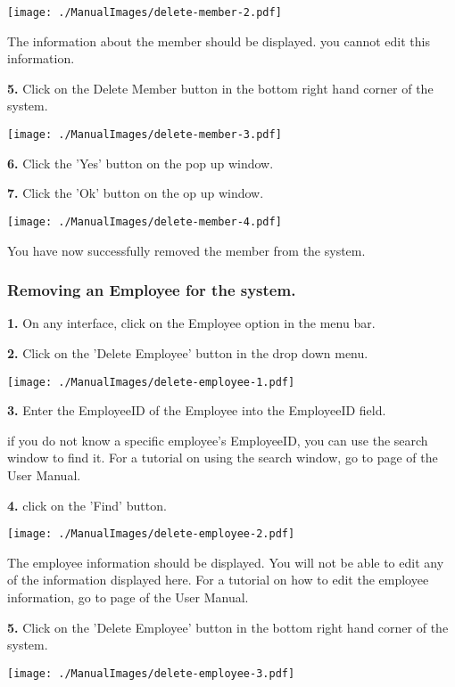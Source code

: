 \texttt{[image: ./ManualImages/delete-member-2.pdf]}

The information about the member should be displayed. you cannot edit this information.

\textbf{5.} Click on the Delete Member button in the bottom right hand corner of the system. 

\texttt{[image: ./ManualImages/delete-member-3.pdf]}

\textbf{6.} Click the 'Yes' button on the pop up window.

\textbf{7.} Click the 'Ok' button on the op up window.

\texttt{[image: ./ManualImages/delete-member-4.pdf]}

You have now successfully removed the member from the system.

\pagebreak
\subsubsection{Removing an Employee for the system.}
\label{fig:Removing an Employee for the system.}

\textbf{1.} On any interface, click on the Employee option in the menu bar.

\textbf{2.} Click on the 'Delete Employee' button in the drop down menu.

\texttt{[image: ./ManualImages/delete-employee-1.pdf]}

\textbf{3.} Enter the EmployeeID of the Employee into the EmployeeID field.

if you do not know a specific employee's EmployeeID, you can use the search window to find it. For a tutorial on using the search window, go to page \pageref{fig:Using the search window} of the User Manual.

\textbf{4.} click on the 'Find' button.

\texttt{[image: ./ManualImages/delete-employee-2.pdf]}

The employee information should be displayed. You will not be able to edit any of the information displayed here. For a tutorial on how to edit the employee information, go to page \pageref{fig:Editing an Employee in the system} of the User Manual.

\textbf{5.} Click on the 'Delete Employee' button in the bottom right hand corner of the system.

\texttt{[image: ./ManualImages/delete-employee-3.pdf]}

